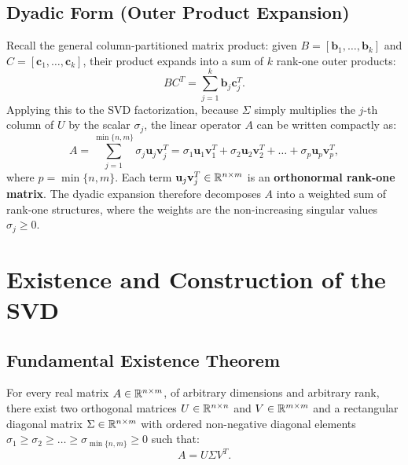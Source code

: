 \subsection{Dyadic Form (Outer Product Expansion)}

Recall the general column-partitioned matrix product: given $B = [\mathbf{b}_1, \dots, \mathbf{b}_k]$ and $C = [\mathbf{c}_1, \dots, \mathbf{c}_k]$, their product expands into a sum of $k$ rank-one outer products:
\begin{equation}
    B C^T = \sum_{j=1}^k \mathbf{b}_j \mathbf{c}_j^T.
\end{equation}
Applying this to the SVD factorization, because $\Sigma$ simply multiplies the $j$-th column of $U$ by the scalar $\sigma_j$, the linear operator $A$ can be written compactly as:
\begin{equation}
\label{eq:svd-dyadic-form-en}
    A = \sum_{j=1}^{\min\{n, m\}} \sigma_j \mathbf{u}_j \mathbf{v}_j^T = \sigma_1 \mathbf{u}_1 \mathbf{v}_1^T + \sigma_2 \mathbf{u}_2 \mathbf{v}_2^T + \dots + \sigma_p \mathbf{u}_p \mathbf{v}_p^T,
\end{equation}
where $p = \min\{n, m\}$. Each term $\mathbf{u}_j \mathbf{v}_j^T \in \mathbb{R}^{n \times m}$ is an \textbf{orthonormal rank-one matrix}. The dyadic expansion therefore decomposes $A$ into a weighted sum of rank-one structures, where the weights are the non-increasing singular values $\sigma_j \ge 0$.

\FloatBarrier
\section{Existence and Construction of the SVD}
\label{sec:svd-existence-construction-en}

\subsection{Fundamental Existence Theorem}

\begin{theorem}
\label{thm:existence-svd-en}
For every real matrix $A \in \mathbb{R}^{n \times m}$, of arbitrary dimensions and arbitrary rank, there exist two orthogonal matrices $U \in \mathbb{R}^{n \times n}$ and $V \in \mathbb{R}^{m \times m}$ and a rectangular diagonal matrix $\Sigma \in \mathbb{R}^{n \times m}$ with ordered non-negative diagonal elements $\sigma_1 \ge \sigma_2 \ge \dots \ge \sigma_{\min\{n,m\}} \ge 0$ such that:
\begin{equation}
    A = U \Sigma V^T.
\end{equation}
\end{theorem}

